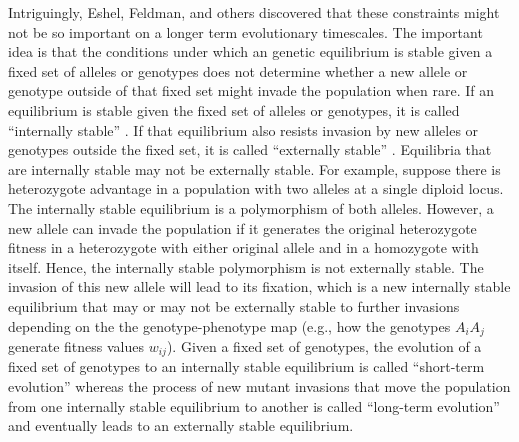 \documentclass[11pt]{article}
\begin{document}
Intriguingly, Eshel, Feldman, and others discovered that these constraints might not be so important on a longer term evolutionary timescales. The important idea is that the conditions under which an genetic equilibrium is stable given a fixed set of alleles or genotypes does not determine whether a new allele or genotype outside of that fixed set might invade the population when rare. If an equilibrium is stable given the fixed set of alleles or genotypes, it is called ``internally stable'' \cite{Eshel:1996}. If that equilibrium also resists invasion by new alleles or genotypes outside the fixed set, it is called ``externally stable'' \cite{Liberman:1988,Eshel:1996}. Equilibria that are internally stable may not be externally stable. For example, suppose there is heterozygote advantage in a population with two alleles at a single diploid locus. The internally stable equilibrium is a polymorphism of both alleles. However, a new allele can invade the population if it generates the original heterozygote fitness in a heterozygote with either original allele and in a homozygote with itself. Hence, the internally stable polymorphism is not externally stable. The invasion of this new allele will lead to its fixation, which is a new internally stable equilibrium that may or may not be externally stable to further invasions depending on the the genotype-phenotype map (e.g., how the genotypes $A_{i} A_{j}$ generate fitness values $w_{ij}$). Given a fixed set of genotypes, the evolution of a fixed set of genotypes to an internally stable equilibrium is called ``short-term evolution'' whereas the  process of new mutant invasions that move the population from one internally stable equilibrium to another is called ``long-term evolution'' \cite{Eshel:1991,Eshel:1996,Hammerstein:1996,Weissing:1996,Eshel:Feldman:1998,VanCleve:2015,VanCleve:2020} and eventually leads to an externally stable equilibrium.
\end{document}
